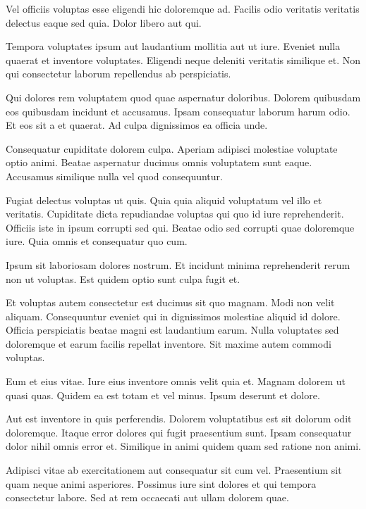 \documentclass[a4paper]{article}
\begin{document}
\begin{multicols}{2}
Vel officiis voluptas esse eligendi hic doloremque ad. Facilis odio veritatis
    veritatis delectus eaque sed quia. Dolor libero aut qui.

Tempora voluptates ipsum aut laudantium mollitia aut ut iure. Eveniet nulla
    quaerat et inventore voluptates. Eligendi neque deleniti veritatis similique
    et. Non qui consectetur laborum repellendus ab perspiciatis.

Qui dolores rem voluptatem quod quae aspernatur doloribus. Dolorem quibusdam eos
    quibusdam incidunt et accusamus. Ipsam consequatur laborum harum odio. Et
    eos sit a et quaerat. Ad culpa dignissimos ea officia unde.

Consequatur cupiditate dolorem culpa. Aperiam adipisci molestiae voluptate optio
    animi. Beatae aspernatur ducimus omnis voluptatem sunt eaque. Accusamus
    similique nulla vel quod consequuntur.

Fugiat delectus voluptas ut quis. Quia quia aliquid voluptatum vel illo et
veritatis. Cupiditate dicta repudiandae voluptas qui quo id iure reprehenderit.
Officiis iste in ipsum corrupti sed qui. Beatae odio sed corrupti quae
doloremque iure. Quia omnis et consequatur quo cum.

Ipsum sit laboriosam dolores nostrum. Et incidunt minima reprehenderit rerum non
ut voluptas. Est quidem optio sunt culpa fugit et.

Et voluptas autem consectetur est ducimus sit quo magnam. Modi non velit
aliquam. Consequuntur eveniet qui in dignissimos molestiae aliquid id dolore.
Officia perspiciatis beatae magni est laudantium earum. Nulla voluptates sed
doloremque et earum facilis repellat inventore. Sit maxime autem commodi
voluptas.

Eum et eius vitae. Iure eius inventore omnis velit quia et. Magnam dolorem ut
quasi quas. Quidem ea est totam et vel minus. Ipsum deserunt et dolore.

Aut est inventore in quis perferendis. Dolorem voluptatibus est sit dolorum odit
doloremque. Itaque error dolores qui fugit praesentium sunt. Ipsam consequatur
dolor nihil omnis error et. Similique in animi quidem quam sed ratione non
animi.

Adipisci vitae ab exercitationem aut consequatur sit cum vel. Praesentium sit
quam neque animi asperiores. Possimus iure sint dolores et qui tempora
consectetur labore. Sed at rem occaecati aut ullam dolorem quae.

\end{multicols}
\end{document}
